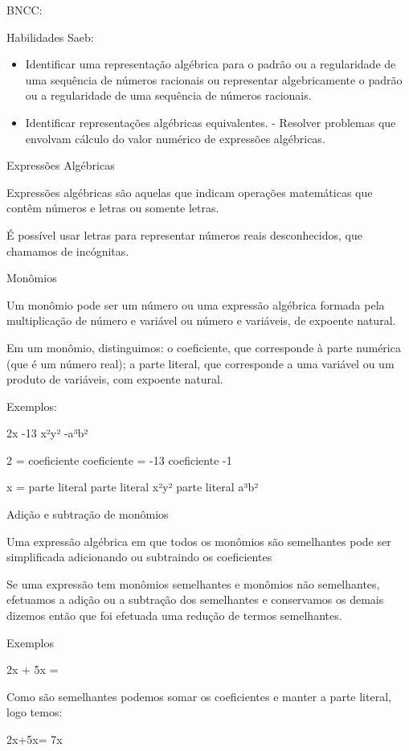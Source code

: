 BNCC:

Habilidades Saeb:

\begin{itemize}
\item
  Identificar uma representação algébrica para o padrão ou a
  regularidade de uma sequência de números racionais ou representar
  algebricamente o padrão ou a regularidade de uma sequência de números
  racionais.
\item
  Identificar representações algébricas equivalentes. - Resolver
  problemas que envolvam cálculo do valor numérico de expressões
  algébricas.
\end{itemize}

Expressões Algébricas

Expressões algébricas são aquelas que indicam operações matemáticas que
contêm números e letras ou somente letras.

É possível usar letras para representar números reais desconhecidos, que
chamamos de incógnitas.

Monômios

Um monômio pode ser um número ou uma expressão algébrica formada pela
multiplicação de número e variável ou número e variáveis, de expoente
natural.

Em um monômio, distinguimos: o coeficiente, que corresponde à parte
numérica (que é um número real); a parte literal, que corresponde a uma
variável ou um produto de variáveis, com expoente natural.

Exemplos:

2x -13 x²y² -a³b²

2 = coeficiente coeficiente = -13 coeficiente -1

x = parte literal parte literal x²y² parte literal a³b²

Adição e subtração de monômios

Uma expressão algébrica em que todos os monômios são semelhantes pode
ser simplificada adicionando ou subtraindo os coeficientes

Se uma expressão tem monômios semelhantes e monômios não semelhantes,
efetuamos a adição ou a subtração dos semelhantes e conservamos os
demais dizemos então que foi efetuada uma redução de termos semelhantes.

Exemplos

2x + 5x =

Como são semelhantes podemos somar os coeficientes e manter a parte
literal, logo temos:

2x+5x= 7x


